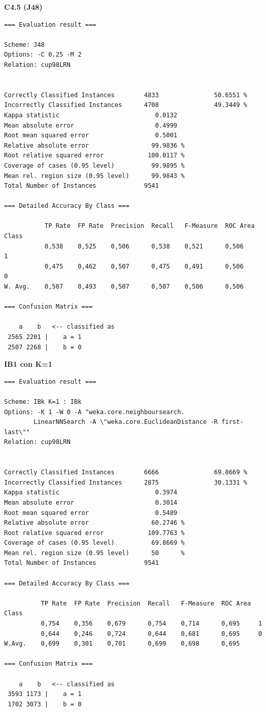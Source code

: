 \textbf{\Large C4.5 (J48)}

\begin{verbatim}
=== Evaluation result ===

Scheme: J48
Options: -C 0.25 -M 2
Relation: cup98LRN


Correctly Classified Instances        4833               50.6551 %
Incorrectly Classified Instances      4708               49.3449 %
Kappa statistic                          0.0132
Mean absolute error                      0.4999
Root mean squared error                  0.5001
Relative absolute error                 99.9836 %
Root relative squared error            100.0117 %
Coverage of cases (0.95 level)          99.9895 %
Mean rel. region size (0.95 level)      99.9843 %
Total Number of Instances             9541     

=== Detailed Accuracy By Class ===

           TP Rate  FP Rate  Precision  Recall   F-Measure  ROC Area  Class
           0,538    0,525    0,506      0,538    0,521      0,506     1
           0,475    0,462    0,507      0,475    0,491      0,506     0
W. Avg.    0,507    0,493    0,507      0,507    0,506      0,506      

=== Confusion Matrix ===

    a    b   <-- classified as
 2565 2201 |    a = 1
 2507 2268 |    b = 0
\end{verbatim}

\textbf{\Large IB1 con K=1}

\begin{verbatim}
=== Evaluation result ===

Scheme: IBk K=1 : IBk
Options: -K 1 -W 0 -A "weka.core.neighboursearch.
		LinearNNSearch -A \"weka.core.EuclideanDistance -R first-last\""
Relation: cup98LRN


Correctly Classified Instances        6666               69.8669 %
Incorrectly Classified Instances      2875               30.1331 %
Kappa statistic                          0.3974
Mean absolute error                      0.3014
Root mean squared error                  0.5489
Relative absolute error                 60.2746 %
Root relative squared error            109.7763 %
Coverage of cases (0.95 level)          69.8669 %
Mean rel. region size (0.95 level)      50      %
Total Number of Instances             9541     

=== Detailed Accuracy By Class ===

          TP Rate  FP Rate  Precision  Recall   F-Measure  ROC Area  Class
          0,754    0,356    0,679      0,754    0,714      0,695     1
          0,644    0,246    0,724      0,644    0,681      0,695     0
W.Avg.    0,699    0,301    0,701      0,699    0,698      0,695         

=== Confusion Matrix ===

    a    b   <-- classified as
 3593 1173 |    a = 1
 1702 3073 |    b = 0
\end{verbatim}

